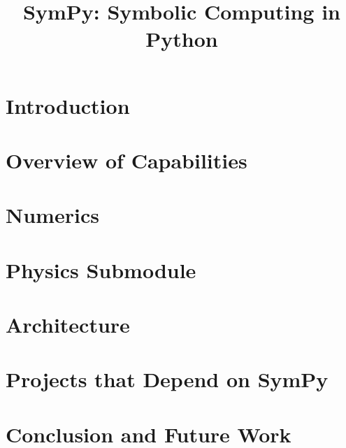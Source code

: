 \documentclass[fleqn,10pt,lineno,numbers]{wlpeerj} %
\title{SymPy: Symbolic Computing in Python}
\begin{document}
\flushbottom
\maketitle
\thispagestyle{empty}

\section{Introduction}




\section{Overview of Capabilities}
\label{sec:features}




\section{Numerics}
\label{sec:numerics}




\section{Physics Submodule}
\label{sec:domain_specific}



\section{Architecture}
\label{sec:architecture}



\section{Projects that Depend on SymPy}
\label{other-proj}


\section{Conclusion and Future Work}
\label{sec:conclusion}




\end{document}
